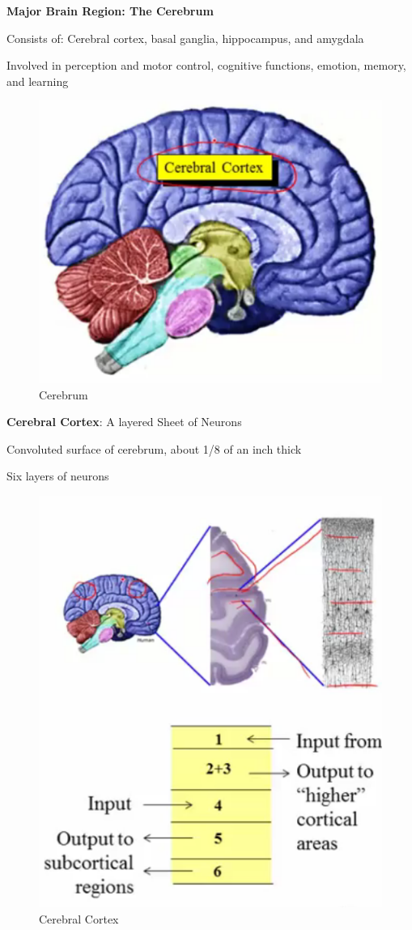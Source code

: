 \documentclass{book}
\begin{document}
 
\textbf{Major Brain Region: The Cerebrum}

Consists of: Cerebral cortex, basal ganglia, hippocampus, and amygdala

Involved in perception and motor control, cognitive functions, emotion, memory, and learning

\begin{figure}[h]
\centering
\includegraphics[width=0.7\linewidth]{./figures/cerebrum}
\caption{Cerebrum}
\label{fig:cerebrum}
\end{figure}


\textbf{Cerebral Cortex}: A layered Sheet of Neurons

Convoluted surface of cerebrum, about 1/8 of an inch thick

Six layers of neurons

\begin{figure}[h]
\centering
\includegraphics[width=0.7\linewidth]{./figures/cerabral}
\caption{Cerebral Cortex}
\label{fig:cerabral}
\end{figure}
\end{document}

